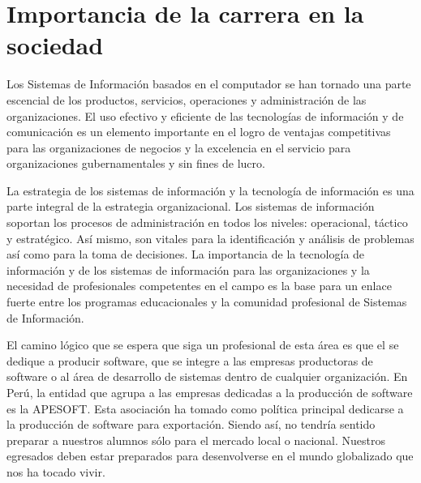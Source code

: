 \section{Importancia de la carrera en la sociedad}\label{sec:cs-importancia-en-la-sociedad}

Los Sistemas de Información basados en el computador se han tornado una parte escencial de los productos, servicios, operaciones y administración de las organizaciones. El uso efectivo y eficiente de las tecnologías de información y de comunicación es un elemento importante en el logro de ventajas competitivas para las organizaciones de negocios y la excelencia en el servicio para organizaciones gubernamentales y sin fines de lucro. 

La estrategia de los sistemas de información y la tecnología de información es una parte integral de la estrategia organizacional. Los sistemas de información soportan los procesos de administración en todos los niveles: operacional, táctico y estratégico. Así mismo, son vitales para la identificación y análisis de problemas así como para la toma de decisiones. La importancia de la tecnología de información y de los sistemas de información para las organizaciones y la necesidad de profesionales competentes en el campo es la base para un enlace fuerte entre los programas educacionales y la comunidad profesional de Sistemas de Información.

El camino lógico que se espera que siga un profesional de esta área es que el se dedique a 
producir software, que se integre a las empresas productoras de software o al área de desarrollo de sistemas
dentro de cualquier organización. En Perú, la entidad que agrupa a las empresas dedicadas a la producción de software es la \ac{APESOFT}. Esta asociación ha tomado como política principal dedicarse a la producción de software para exportación. Siendo así, no tendría sentido preparar a nuestros alumnos sólo para el mercado local o nacional. Nuestros egresados deben estar preparados para desenvolverse en el mundo globalizado que nos ha tocado vivir.
